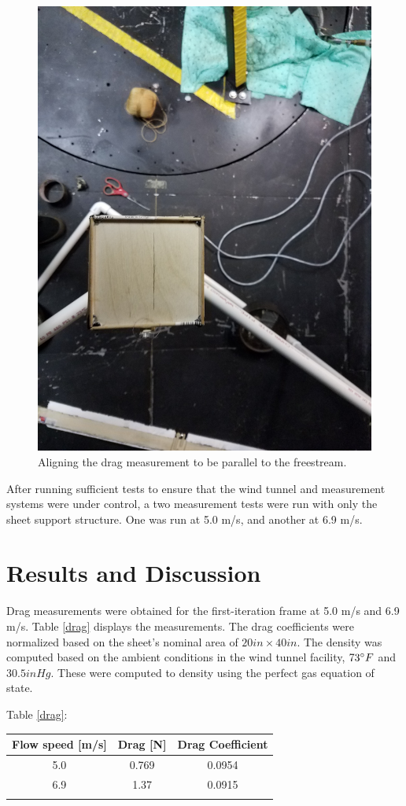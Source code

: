 \documentclass[12pt]{report} %
\begin{document}
\begin{figure}
\includegraphics[width = 0.7\linewidth]{parallel_to_freestream.jpg}
\centering
\caption{Aligning the drag measurement to be parallel to the freestream.}
\label{roller_alignment}
\end{figure}

After running sufficient tests to ensure that the wind tunnel and measurement systems were under control, a two measurement tests
were run with only the sheet support structure. One was run at 5.0 m/s, and another at 6.9 m/s.

\chapter{Results and Discussion}
Drag measurements were obtained for the first-iteration frame at 5.0 m/s and 6.9 m/s. Table \ref{drag} displays the measurements.
The drag coefficients
were normalized based on the sheet's nominal area of $20 in \times 40 in$. The density was computed based on the ambient conditions in
the wind tunnel facility, $73\degree F$ and $30.5 inHg$. These were computed to density using the perfect gas equation of state.

Table \ref{drag}:
\begin{tabular}{c c c}
Flow speed [m/s] & Drag [N] & Drag Coefficient \\ \hline
5.0 & 0.769 & 0.0954 \\
6.9 & 1.37 & 0.0915 \\
\label{drag}
\end{tabular}
\end{document}
